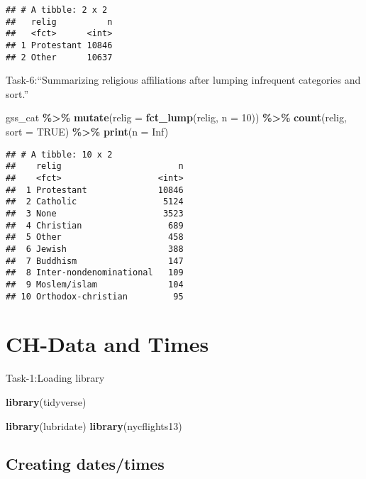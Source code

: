 \documentclass[
]{article}
\newenvironment{Shaded}{\begin{snugshade}}{\end{snugshade}}
\newcommand{\AttributeTok}[1]{\textcolor[rgb]{0.13,0.29,0.53}{#1}}
\newcommand{\ConstantTok}[1]{\textcolor[rgb]{0.56,0.35,0.01}{#1}}
\newcommand{\DecValTok}[1]{\textcolor[rgb]{0.00,0.00,0.81}{#1}}
\newcommand{\FunctionTok}[1]{\textcolor[rgb]{0.13,0.29,0.53}{\textbf{#1}}}
\newcommand{\NormalTok}[1]{#1}
\newcommand{\SpecialCharTok}[1]{\textcolor[rgb]{0.81,0.36,0.00}{\textbf{#1}}}
\begin{document}
\begin{verbatim}
## # A tibble: 2 x 2
##   relig          n
##   <fct>      <int>
## 1 Protestant 10846
## 2 Other      10637
\end{verbatim}

Task-6:``Summarizing religious affiliations after lumping infrequent
categories and sort.''

\begin{Shaded}
\begin{Highlighting}[]
\NormalTok{gss\_cat }\SpecialCharTok{\%\textgreater{}\%}
  \FunctionTok{mutate}\NormalTok{(}\AttributeTok{relig =} \FunctionTok{fct\_lump}\NormalTok{(relig, }\AttributeTok{n =} \DecValTok{10}\NormalTok{)) }\SpecialCharTok{\%\textgreater{}\%}
  \FunctionTok{count}\NormalTok{(relig, }\AttributeTok{sort =} \ConstantTok{TRUE}\NormalTok{) }\SpecialCharTok{\%\textgreater{}\%}
  \FunctionTok{print}\NormalTok{(}\AttributeTok{n =} \ConstantTok{Inf}\NormalTok{)}
\end{Highlighting}
\end{Shaded}

\begin{verbatim}
## # A tibble: 10 x 2
##    relig                       n
##    <fct>                   <int>
##  1 Protestant              10846
##  2 Catholic                 5124
##  3 None                     3523
##  4 Christian                 689
##  5 Other                     458
##  6 Jewish                    388
##  7 Buddhism                  147
##  8 Inter-nondenominational   109
##  9 Moslem/islam              104
## 10 Orthodox-christian         95
\end{verbatim}

\hypertarget{ch-data-and-times}{%
\section{CH-Data and Times}\label{ch-data-and-times}}

Task-1:Loading library

\begin{Shaded}
\begin{Highlighting}[]
\FunctionTok{library}\NormalTok{(tidyverse)}

\FunctionTok{library}\NormalTok{(lubridate)}
\FunctionTok{library}\NormalTok{(nycflights13)}
\end{Highlighting}
\end{Shaded}

\hypertarget{creating-datestimes}{%
\subsection{Creating dates/times}\label{creating-datestimes}}
\end{document}
